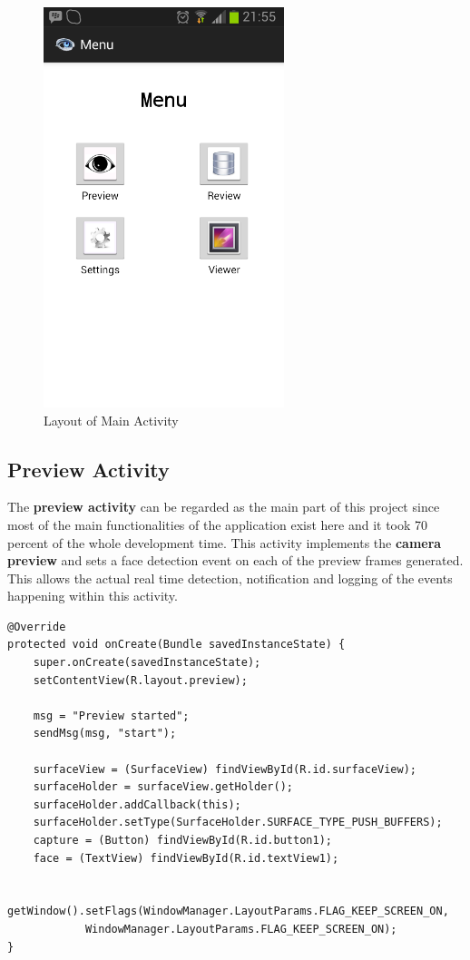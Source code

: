 \begin{figure}[ht!]
\centering
\includegraphics[width=70mm]{main.png}
\caption{Layout of Main Activity}
\label{overflow}
\end{figure}    


\subsection{Preview Activity}
The {\bf preview activity} can be regarded as the main part of this project since most of the main functionalities of the application exist here and it took 70 percent of the whole development time. This activity implements the {\bf camera preview} and sets a face detection event on each of the preview frames generated. This allows the actual real time detection, notification and logging of the events happening within this activity.

\begin{lstlisting}[label=preview-oncreate,caption=Implementation of the preview activity onCreate method] 
@Override
protected void onCreate(Bundle savedInstanceState) {
	super.onCreate(savedInstanceState);
	setContentView(R.layout.preview);

	msg = "Preview started";
	sendMsg(msg, "start");

	surfaceView = (SurfaceView) findViewById(R.id.surfaceView);
	surfaceHolder = surfaceView.getHolder();
	surfaceHolder.addCallback(this);
	surfaceHolder.setType(SurfaceHolder.SURFACE_TYPE_PUSH_BUFFERS);
	capture = (Button) findViewById(R.id.button1);
	face = (TextView) findViewById(R.id.textView1);
		
	getWindow().setFlags(WindowManager.LayoutParams.FLAG_KEEP_SCREEN_ON,
			WindowManager.LayoutParams.FLAG_KEEP_SCREEN_ON);
} 
\end{lstlisting}

